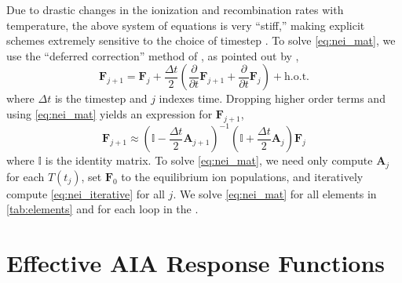 Due to drastic changes in the ionization and recombination rates with temperature, the above system of equations is very ``stiff,'' making explicit schemes extremely sensitive to the choice of timestep \citep{macneice_numerical_1984,bradshaw_numerical_2009}. To solve \autoref{eq:nei_mat}, we use the ``deferred correction'' method of \citet{npl_modern_1961}, as pointed out by \citet{macneice_numerical_1984},
\begin{equation*}
    \mathbf{F}_{j+1} = \mathbf{F}_j + \frac{\Delta t}{2}(\frac{\partial}{\partial t}\mathbf{F}_{j+1} + \frac{\partial}{\partial t}\mathbf{F}_j) + \mathrm{h.o.t.}
\end{equation*}
where $\Delta t$ is the timestep and $j$ indexes time. Dropping higher order terms and using \autoref{eq:nei_mat} yields an expression for $\mathbf{F}_{j+1}$,
\begin{equation}\label{eq:nei_iterative}
    \mathbf{F}_{j+1} \approx \left(\mathbb{I} - \frac{\Delta t}{2}\mathbf{A}_{j+1}\right)^{-1}\left(\mathbb{I} + \frac{\Delta t}{2}\mathbf{A}_{j}\right)\mathbf{F}_j
\end{equation}
where $\mathbb{I}$ is the identity matrix. To solve \autoref{eq:nei_mat}, we need only compute $\mathbf{A}_j$ for each $T(t_j)$, set $\mathbf{F}_0$ to the equilibrium ion populations, and iteratively compute \autoref{eq:nei_iterative} for all $j$. We solve \autoref{eq:nei_mat} for all elements in \autoref{tab:elements} and for each loop in the \AR{}.

\section{Effective AIA Response Functions}\label{effective_response_functions}


